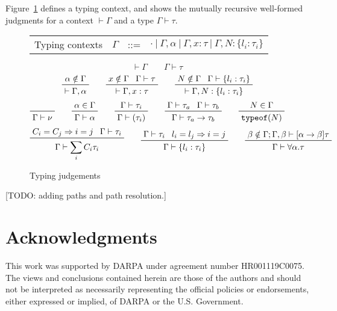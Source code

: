 \documentclass[letterpaper]{article}
\newcommand{\todo}[1]{{\color{red}[TODO: #1]}}
\begin{document}
Figure~\ref{f:ctxt} defines a typing context, and shows the mutually
recursive well-formed judgments for a context $\vdash\Gamma$ and a
type $\Gamma\vdash\tau$.

\begin{figure}
    \begin{tabular}{l c l l}
    Typing contexts        & $\Gamma$      & ::= & $\cdot\ |\ \Gamma, \alpha\ |\ \Gamma, x: \tau\ |\ \Gamma, N: \{l_i:\tau_i\}$ \\
  \end{tabular}

  $$ \boxed{\vdash\Gamma} \qquad \boxed{\Gamma\vdash\tau} $$
  $$ \prftree{\prfassumption{\alpha\notin\Gamma}}
             {\vdash\Gamma, \alpha}\qquad
     \prftree{\prfassumption{x\notin\Gamma}}{\prfassumption{\Gamma\vdash\tau}}
             {\vdash\Gamma, x:\tau}\qquad
     \prftree{\prfassumption{N\notin\Gamma}}{\prfassumption{\Gamma\vdash\{l_i:\tau_i\}}}
             {\vdash\Gamma, N:\{l_i:\tau_i\}} $$
  $$ \prfaxiom{\Gamma\vdash\nu}\qquad
     \prftree{\prfassumption{\alpha\in\Gamma}}
             {\Gamma\vdash\alpha}\qquad
     \prftree{\prfassumption{\Gamma\vdash\tau_i}}
             {\Gamma\vdash(\tau_i)}\qquad
     \prftree{\prfassumption{\Gamma\vdash\tau_a}}{\prfassumption{\Gamma\vdash\tau_b}}
             {\Gamma\vdash\tau_a\rightarrow\tau_b}\qquad
     \prftree{\prfassumption{N\in\Gamma}}
             {\texttt{typeof}(N)} $$
  $$ \prftree{\prfassumption{C_i=C_j\Rightarrow i=j}}{\prfassumption{\Gamma\vdash\tau_i}}
             {\Gamma\vdash\sum_i C_i\tau_i}\qquad
     \prftree{\prfassumption{\Gamma\vdash\tau_i}}{\prfassumption{l_i=l_j\Rightarrow i=j}}
             {\Gamma\vdash\{l_i:\tau_i\}}\qquad
     \prftree{\prfassumption{\beta\notin\Gamma; \Gamma,\beta\vdash[\alpha\rightarrow\beta]\tau}}
             {\Gamma\vdash\forall\alpha.\tau} $$
  \caption{Typing judgements}
  \label{f:ctxt}
\end{figure}

\todo{adding paths and path resolution.}

\section*{Acknowledgments}
This work was supported by DARPA under agreement number HR001119C0075.
The views and conclusions contained herein are those of the authors
and should not be interpreted as necessarily representing the official
policies or endorsements, either expressed or implied, of DARPA or the
U.S. Government.



\end{document}
